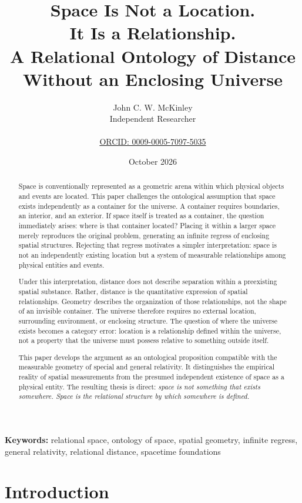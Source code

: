 \documentclass[12pt,onecolumn]{article}
\title{\textbf{Space Is Not a Location.\\
It Is a Relationship.}\\[0.5em]
\large A Relational Ontology of Distance Without
an Enclosing Universe}
\author{
John C. W. McKinley\\
Independent Researcher\\
\orcidlink{0009-0005-7097-5035}\\
\href{https://orcid.org/0009-0005-7097-5035}
{ORCID: 0009-0005-7097-5035}
}
\date{October 2026}
\begin{document}
\maketitle

\begin{abstract}
Space is conventionally represented as a geometric
arena within which physical objects and events are
located. This paper challenges the ontological
assumption that space exists independently as a
container for the universe. A container requires
boundaries, an interior, and an exterior. If space
itself is treated as a container, the question
immediately arises: where is that container located?
Placing it within a larger space merely reproduces
the original problem, generating an infinite regress
of enclosing spatial structures. Rejecting that
regress motivates a simpler interpretation: space
is not an independently existing location but a
system of measurable relationships among physical
entities and events.

Under this interpretation, distance does not describe
separation within a preexisting spatial substance.
Rather, distance is the quantitative expression of
spatial relationships. Geometry describes the
organization of those relationships, not the shape
of an invisible container. The universe therefore
requires no external location, surrounding
environment, or enclosing structure. The question
of where the universe exists becomes a category
error: location is a relationship defined within
the universe, not a property that the universe must
possess relative to something outside itself.

This paper develops the argument as an ontological
proposition compatible with the measurable geometry
of special and general relativity. It distinguishes
the empirical reality of spatial measurements from
the presumed independent existence of space as a
physical entity. The resulting thesis is direct:
\emph{space is not something that exists somewhere.
Space is the relational structure by which somewhere
is defined.}
\end{abstract}

\noindent\textbf{Keywords:}
relational space, ontology of space, spatial geometry,
infinite regress, general relativity, relational
distance, spacetime foundations

\section{Introduction}
\end{document}
